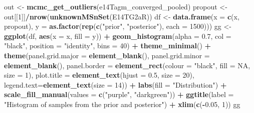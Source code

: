 \documentclass[
]{article}
\newenvironment{Shaded}{\begin{snugshade}}{\end{snugshade}}
\newcommand{\DataTypeTok}[1]{\textcolor[rgb]{0.13,0.29,0.53}{#1}}
\newcommand{\DecValTok}[1]{\textcolor[rgb]{0.00,0.00,0.81}{#1}}
\newcommand{\FloatTok}[1]{\textcolor[rgb]{0.00,0.00,0.81}{#1}}
\newcommand{\KeywordTok}[1]{\textcolor[rgb]{0.13,0.29,0.53}{\textbf{#1}}}
\newcommand{\NormalTok}[1]{#1}
\newcommand{\OperatorTok}[1]{\textcolor[rgb]{0.81,0.36,0.00}{\textbf{#1}}}
\newcommand{\OtherTok}[1]{\textcolor[rgb]{0.56,0.35,0.01}{#1}}
\newcommand{\StringTok}[1]{\textcolor[rgb]{0.31,0.60,0.02}{#1}}
\begin{document}
\begin{Shaded}
\begin{Highlighting}[]
\NormalTok{out <-}\StringTok{ }\KeywordTok{mcmc_get_outliers}\NormalTok{(e14Tagm_converged_pooled)}
\NormalTok{propout <-}\StringTok{ }\NormalTok{out[[}\DecValTok{1}\NormalTok{]]}\OperatorTok{/}\KeywordTok{nrow}\NormalTok{(}\KeywordTok{unknownMSnSet}\NormalTok{(E14TG2aR))}
\NormalTok{df <-}\StringTok{ }\KeywordTok{data.frame}\NormalTok{(}\DataTypeTok{x =} \KeywordTok{c}\NormalTok{(x, propout), }\DataTypeTok{y =} \KeywordTok{as.factor}\NormalTok{(}\KeywordTok{rep}\NormalTok{(}\KeywordTok{c}\NormalTok{(}\StringTok{"prior"}\NormalTok{, }\StringTok{"posterior"}\NormalTok{), }\DataTypeTok{each =} \DecValTok{1500}\NormalTok{)))}
\NormalTok{gg <-}\StringTok{ }\KeywordTok{ggplot}\NormalTok{(df, }\KeywordTok{aes}\NormalTok{(}\DataTypeTok{x =}\NormalTok{ x, }\DataTypeTok{fill =}\NormalTok{ y)) }\OperatorTok{+}\StringTok{ }\KeywordTok{geom_histogram}\NormalTok{(}\DataTypeTok{alpha =} \FloatTok{0.7}\NormalTok{, }\DataTypeTok{col =} \StringTok{"black"}\NormalTok{, }\DataTypeTok{position =} \StringTok{"identity"}\NormalTok{, }\DataTypeTok{bins =} \DecValTok{40}\NormalTok{) }\OperatorTok{+}\StringTok{ }
\StringTok{      }\KeywordTok{theme_minimal}\NormalTok{() }\OperatorTok{+}\StringTok{ }
\StringTok{      }\KeywordTok{theme}\NormalTok{(}\DataTypeTok{panel.grid.major =} \KeywordTok{element_blank}\NormalTok{(), }\DataTypeTok{panel.grid.minor =} \KeywordTok{element_blank}\NormalTok{(),}
           \DataTypeTok{panel.border =} \KeywordTok{element_rect}\NormalTok{(}\DataTypeTok{colour =} \StringTok{"black"}\NormalTok{, }\DataTypeTok{fill =} \OtherTok{NA}\NormalTok{, }\DataTypeTok{size =} \DecValTok{1}\NormalTok{),}
           \DataTypeTok{plot.title =} \KeywordTok{element_text}\NormalTok{(}\DataTypeTok{hjust =} \FloatTok{0.5}\NormalTok{, }\DataTypeTok{size =} \DecValTok{20}\NormalTok{),}
           \DataTypeTok{legend.text=}\KeywordTok{element_text}\NormalTok{(}\DataTypeTok{size =} \DecValTok{14}\NormalTok{)) }\OperatorTok{+}\StringTok{ }\KeywordTok{labs}\NormalTok{(}\DataTypeTok{fill =} \StringTok{"Distribution"}\NormalTok{) }\OperatorTok{+}\StringTok{ }
\StringTok{      }\KeywordTok{scale_fill_manual}\NormalTok{(}\DataTypeTok{values =} \KeywordTok{c}\NormalTok{(}\StringTok{"purple"}\NormalTok{, }\StringTok{"darkgreen"}\NormalTok{)) }\OperatorTok{+}\StringTok{ }
\StringTok{      }\KeywordTok{ggtitle}\NormalTok{(}\DataTypeTok{label =} \StringTok{"Histogram of samples from the prior and posterior"}\NormalTok{) }\OperatorTok{+}\StringTok{ }\KeywordTok{xlim}\NormalTok{(}\KeywordTok{c}\NormalTok{(}\OperatorTok{-}\FloatTok{0.05}\NormalTok{, }\DecValTok{1}\NormalTok{))}
\NormalTok{gg}
\end{Highlighting}
\end{Shaded}
\end{document}
